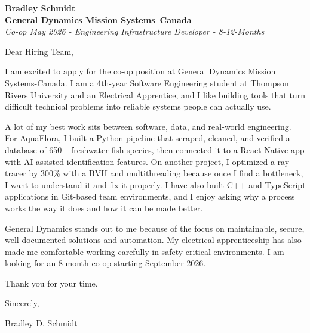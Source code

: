 \documentclass[11pt]{article}
\begin{document}
\textbf{Bradley Schmidt}\\
\vspace{0.5em}
\textbf{General Dynamics Mission Systems–Canada}\\
\textit{Co-op May 2026 - Engineering Infrastructure Developer - 8-12-Months}

Dear Hiring Team,

\par

I am excited to apply for the co-op position at General Dynamics Mission Systems-Canada. I am a 4th-year Software Engineering student at Thompson Rivers University and an Electrical Apprentice, and I like building tools that turn difficult technical problems into reliable systems people can actually use.

\par

A lot of my best work sits between software, data, and real-world engineering. For AquaFlora, I built a Python pipeline that scraped, cleaned, and verified a database of 650+ freshwater fish species, then connected it to a React Native app with AI-assisted identification features. On another project, I optimized a ray tracer by 300\% with a BVH and multithreading because once I find a bottleneck, I want to understand it and fix it properly. I have also built C++ and TypeScript applications in Git-based team environments, and I enjoy asking why a process works the way it does and how it can be made better.

\par

General Dynamics stands out to me because of the focus on maintainable, secure, well-documented solutions and automation. My electrical apprenticeship has also made me comfortable working carefully in safety-critical environments. I am looking for an 8-month co-op starting September 2026.

\par

Thank you for your time.

\par

Sincerely,

\par

Bradley D. Schmidt
\end{document}
